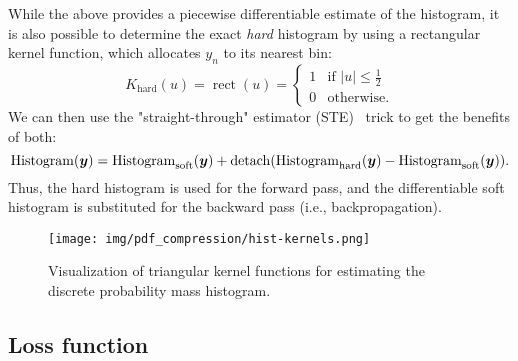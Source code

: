 While the above provides a piecewise differentiable estimate of the histogram, it is also possible to determine the exact \emph{hard} histogram by using a rectangular kernel function, which allocates $y_n$ to its nearest bin:
\begin{equation*}
  K_{\mathrm{hard}}(u) = \operatorname{rect}(u) =
  \begin{cases}
    1 & \text{if } |u| \leq \frac{1}{2} \\
    0 & \text{otherwise}.
  \end{cases}
\end{equation*}
We can then use the "straight-through" estimator (STE)~\cite{bengio2013estimating} trick to get the benefits of both:
\begin{equation*}
  \operatorname{Histogram}({\boldsymbol{y}}) =
  \operatorname{Histogram}_{\mathrm{soft}}({\boldsymbol{y}}) +
  \operatorname{detach}(
    \operatorname{Histogram}_{\mathrm{hard}}({\boldsymbol{y}}) -
    \operatorname{Histogram}_{\mathrm{soft}}({\boldsymbol{y}})
  ).
\end{equation*}
Thus, the hard histogram is used for the forward pass, and the differentiable soft histogram is substituted for the backward pass (i.e., backpropagation).

\begin{figure}[tb]
  \centering
  \texttt{[image: img/pdf\_compression/hist-kernels.png]}
  \caption[Kernel functions]{%
    Visualization of triangular kernel functions for estimating the discrete probability mass histogram.%
  }
  \label{fig:pdf/kernels}
\end{figure}




\subsection{Loss function}
\label{sec:pdf_compression/loss}

